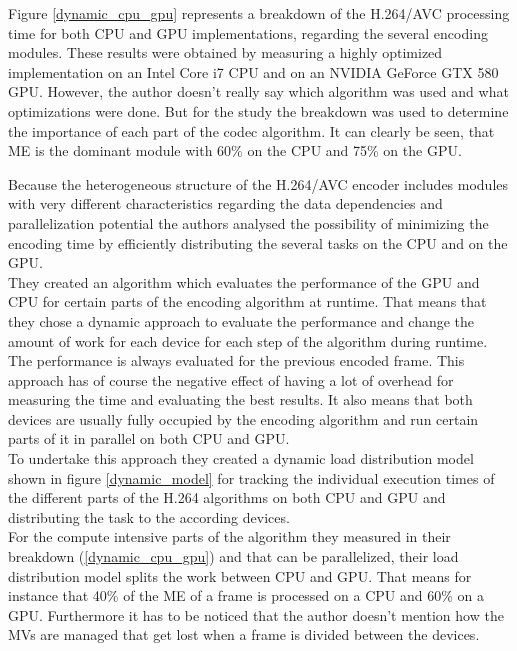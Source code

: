 Figure \ref{dynamic_cpu_gpu} represents a breakdown of the H.264/AVC processing time for both CPU and GPU implementations, regarding the several encoding modules. These results were obtained by measuring  a highly optimized implementation on an Intel Core i7 CPU and on an NVIDIA GeForce GTX 580 GPU. However, the author doesn't really say which algorithm was used and what optimizations were done. But for the study the breakdown was used to determine the importance of each part of the codec algorithm. It can clearly be seen, that ME is the dominant module with 60\% on the CPU and 75\% on the GPU.

Because the heterogeneous structure of the H.264/AVC encoder includes modules with very different characteristics regarding the data dependencies and parallelization potential the authors analysed the possibility of minimizing the encoding time by efficiently distributing the several tasks on the CPU and on the GPU.\\

They created an algorithm which evaluates the performance of the GPU and CPU for certain parts of the encoding algorithm at runtime. That means that they chose a dynamic approach to evaluate the performance and change the amount of work for each device for each step of the algorithm during runtime. The performance is always evaluated for the previous encoded frame. This approach has of course the negative effect of having a lot of overhead for measuring the time and evaluating the best results. It also means that both devices are usually fully occupied by the encoding algorithm and run certain parts of it in parallel on both CPU and GPU. \\
To undertake this approach they created a dynamic load distribution model shown in figure \ref{dynamic_model} for tracking the individual execution times of the different parts of the H.264 algorithms on both CPU and GPU and distributing the task to the according devices.\\
For the compute intensive parts of the algorithm they measured in their breakdown (\ref{dynamic_cpu_gpu}) and that can be parallelized, their load distribution model splits the work between CPU and GPU. That means for instance that 40\% of the ME of a frame is processed on a CPU and 60\% on a GPU. Furthermore it has to be noticed that the author doesn't mention how the MVs are managed that get lost when a frame is divided between the devices.

